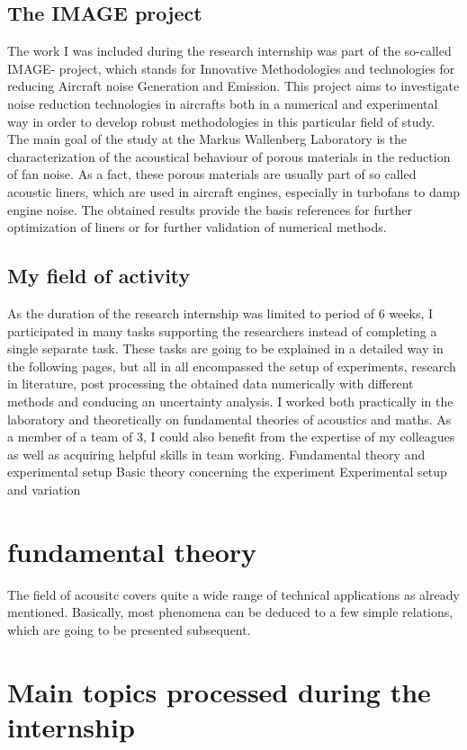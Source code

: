 \documentclass{article}
\begin{document}
\subsection{The IMAGE project} 
The work I was included during the research internship was part of the so-called IMAGE- project, which stands for Innovative Methodologies and technologies for reducing Aircraft noise Generation and Emission. This project aims to investigate noise reduction technologies in aircrafts both in a numerical and experimental way in order to develop robust methodologies in this particular field of study.  
The main goal of the study at the Markus Wallenberg Laboratory is the characterization of the acoustical behaviour of porous materials in the reduction of fan noise.  As a fact, these porous materials are usually part of so called acoustic liners, which are used in aircraft engines, especially in turbofans to damp engine noise. The obtained results provide the basis references for further optimization of liners or for further validation of numerical methods. 

\subsection{My field of activity} 
As the duration of the research internship was limited to period of 6 weeks, I participated in many tasks supporting the researchers instead of completing a single separate task.  These tasks are going to be explained in a detailed way in the following pages, but all in all encompassed the setup of experiments, research in literature, post processing the obtained data numerically with different methods and conducing an uncertainty analysis. I worked both practically in the laboratory and theoretically on fundamental theories of acoustics and maths. As a member of a team of 3, I could also benefit from the expertise of my colleagues as well as acquiring helpful skills in team working.
Fundamental theory and experimental setup
Basic theory concerning the experiment
Experimental setup and variation
\section{fundamental theory}
The field of acousitc covers quite a wide range of technical applications as already mentioned. Basically, most phenomena can be deduced to a few simple relations, which are going to be presented subsequent. 
\section{Main topics processed during the internship}
\end{document}
